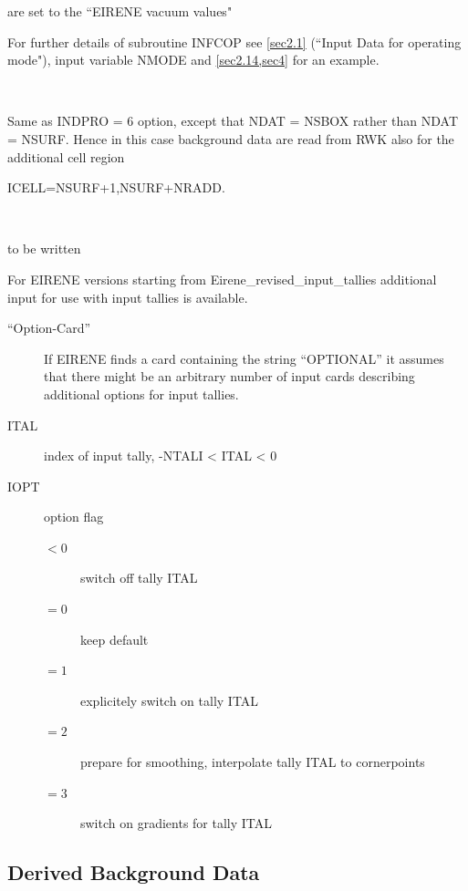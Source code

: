 \begin{description}
\begin{description}
                are set to the ``EIRENE vacuum values"

                For further details of subroutine INFCOP see \cref{sec2.1} (``Input Data for
                operating mode"), input variable NMODE and \cref{sec2.14,sec4} for an example.

          \item[INDPRO = 7] ~

                Same as INDPRO = 6 option, except that NDAT = NSBOX rather than NDAT = NSURF.
                Hence in this case background data are read from RWK also for the additional
                cell region

                ICELL=NSURF+1,NSURF+NRADD.

          \item[INDPRO = 8] ~

                to be written

        \end{description}
\end{description}

For EIRENE versions starting from Eirene\_revised\_input\_tallies additional
input for use with input tallies is available.

\begin{description}
  \item[``Option-Card''] If EIRENE finds a card containing the string ``OPTIONAL''
        it assumes that there might be an arbitrary number of input cards
        describing additional options for input tallies.
  \item[ITAL] index of input tally, -NTALI < ITAL < 0
  \item[IOPT] option flag
        \begin{description}
          \item[$< 0$] switch off tally ITAL
          \item[$= 0$] keep default
          \item[$= 1$] explicitely switch on tally ITAL
          \item[$= 2$] prepare for smoothing, interpolate tally ITAL to cornerpoints
          \item[$= 3$] switch on gradients for tally ITAL
        \end{description}
\end{description}

\subsection{Derived Background Data} \label{sec2.5.1}

